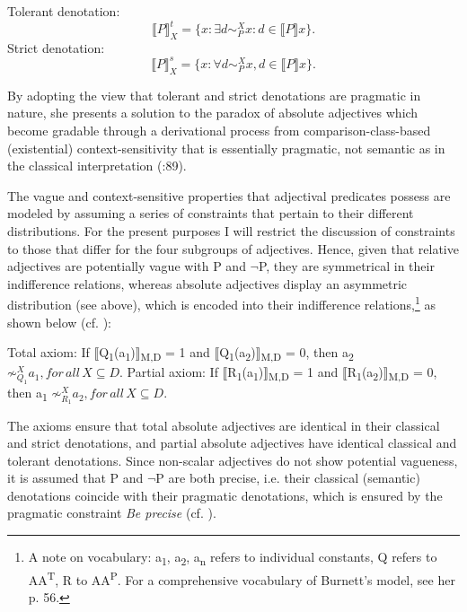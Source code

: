 \documentclass[output=paper]{langsci/langscibook}
\begin{document}
\ea
	Tolerant denotation: \[ \llbracket P \rrbracket_X^t	= \{x : \exists d \sim_P^X  x : d \in \llbracket P\rrbracket x\}\text{.}\]
\z
\ea
	Strict denotation: \[\llbracket P\rrbracket_X^s  = \{ { x :  \forall d \sim _P^X  x, d  \in   \llbracket P \rrbracket x } \}\text{.}\]
\z

By adopting the view that tolerant and strict denotations are pragmatic in nature, she presents a solution to the paradox of absolute adjectives which become gradable through a derivational process from comparison-class-based (existential) context-sensitivity that is essentially pragmatic, not semantic as in the classical interpretation (\citeyear{Burnett2017}:89).

The vague and context-sensitive properties that adjectival predicates possess are modeled by assuming a series of constraints that pertain to their different distributions. For the present purposes I will restrict the discussion of constraints to those that differ for the four subgroups of adjectives. Hence, given that relative adjectives are potentially vague with P and $\neg$P, they are symmetrical in their indifference relations, whereas absolute adjectives display an asymmetric distribution (see above), which is encoded into their indifference relations,\footnote{A note on vocabulary: a\textsubscript{1}, a\textsubscript{2}, a\textsubscript{n} refers to individual constants, Q refers to AA\textsuperscript{T}, R to AA\textsuperscript{P}. For a comprehensive vocabulary of Burnett's model, see her p. 56.} as shown below (cf. \citealt[77]{Burnett2017}):

\ea
	Total axiom: If $\llbracket$Q\textsubscript{1}(a\textsubscript{1})$\rrbracket$\textsubscript{M,D} = 1 and $\llbracket$Q\textsubscript{1}(a\textsubscript{2})$\rrbracket$\textsubscript{M,D} = 0, then a\textsubscript{2} $ \not\sim_{Q_{1}}^X  a_{1}, for \, all \, X \subseteq D.$
\z
\ea
	Partial axiom: If $\llbracket$R\textsubscript{1}(a\textsubscript{1})$\rrbracket$\textsubscript{M,D} = 1 and $\llbracket$R\textsubscript{1}(a\textsubscript{2})$\rrbracket$\textsubscript{M,D} = 0, then a\textsubscript{1} $ \not\sim_{R_{1}}^X  a_{2}, for \, all \, X \subseteq D.$
\z

The axioms ensure that total absolute adjectives are identical in their classical and strict denotations, and partial absolute adjectives have identical classical and tolerant denotations. Since non-scalar adjectives do not show potential vagueness, it is assumed that P and $\neg$P are both precise, i.e. their classical (semantic) denotations coincide with their pragmatic denotations, which is ensured by the pragmatic constraint \textit{Be precise} (cf. \citealt[77--78]{Burnett2017}).
\end{document}
